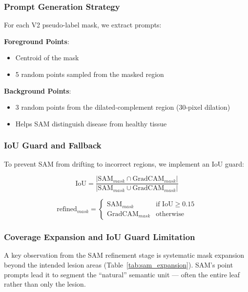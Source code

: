 \documentclass[10pt,a4paper]{article}
\begin{document}
\subsubsection{Prompt Generation Strategy}

For each V2 pseudo-label mask, we extract prompts:

\textbf{Foreground Points}:
\begin{itemize}
\item Centroid of the mask
\item 5 random points sampled from the masked region
\end{itemize}

\textbf{Background Points}:
\begin{itemize}
\item 3 random points from the dilated-complement region (30-pixel dilation)
\item Helps SAM distinguish disease from healthy tissue
\end{itemize}

\subsubsection{IoU Guard and Fallback}

To prevent SAM from drifting to incorrect regions, we implement an IoU guard:

\begin{equation}
\text{IoU} = \frac{|\text{SAM}_{mask} \cap \text{GradCAM}_{mask}|}{|\text{SAM}_{mask} \cup \text{GradCAM}_{mask}|}
\end{equation}

\begin{equation}
\text{refined}_{mask} = \begin{cases}
\text{SAM}_{mask} & \text{if IoU} \geq 0.15 \\
\text{GradCAM}_{mask} & \text{otherwise}
\end{cases}
\end{equation}

\subsubsection{Coverage Expansion and IoU Guard Limitation}

A key observation from the SAM refinement stage is systematic mask expansion beyond the intended lesion areas (Table~\ref{tab:sam_expansion}). SAM's point prompts lead it to segment the ``natural'' semantic unit --- often the entire leaf rather than only the lesion.
\end{document}
